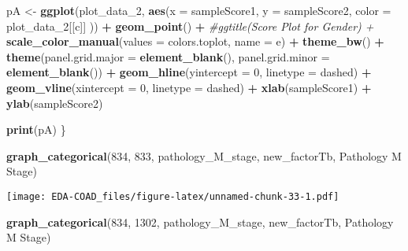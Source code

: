 \documentclass[
]{article}
\newenvironment{Shaded}{\begin{snugshade}}{\end{snugshade}}
\newcommand{\AttributeTok}[1]{\textcolor[rgb]{0.13,0.29,0.53}{#1}}
\newcommand{\CommentTok}[1]{\textcolor[rgb]{0.56,0.35,0.01}{\textit{#1}}}
\newcommand{\DecValTok}[1]{\textcolor[rgb]{0.00,0.00,0.81}{#1}}
\newcommand{\FunctionTok}[1]{\textcolor[rgb]{0.13,0.29,0.53}{\textbf{#1}}}
\newcommand{\NormalTok}[1]{#1}
\newcommand{\OtherTok}[1]{\textcolor[rgb]{0.56,0.35,0.01}{#1}}
\newcommand{\SpecialCharTok}[1]{\textcolor[rgb]{0.81,0.36,0.00}{\textbf{#1}}}
\newcommand{\StringTok}[1]{\textcolor[rgb]{0.31,0.60,0.02}{#1}}
\begin{document}
\begin{Shaded}
\begin{Highlighting}[]
\NormalTok{  pA }\OtherTok{\textless{}{-}} \FunctionTok{ggplot}\NormalTok{(plot\_data\_2,}
             \FunctionTok{aes}\NormalTok{(}\AttributeTok{x =}\NormalTok{ sampleScore1, }\AttributeTok{y =}\NormalTok{ sampleScore2, }\AttributeTok{color =}\NormalTok{ plot\_data\_2[[c]]}
\NormalTok{                 )) }\SpecialCharTok{+}
        \FunctionTok{geom\_point}\NormalTok{() }\SpecialCharTok{+}
        \CommentTok{\#ggtitle(\textquotesingle{}Score Plot for Gender\textquotesingle{}) +}
        \FunctionTok{scale\_color\_manual}\NormalTok{(}\AttributeTok{values =}\NormalTok{ colors.toplot, }\AttributeTok{name =}\NormalTok{ e) }\SpecialCharTok{+}
        \FunctionTok{theme\_bw}\NormalTok{() }\SpecialCharTok{+}
        \FunctionTok{theme}\NormalTok{(}\AttributeTok{panel.grid.major =} \FunctionTok{element\_blank}\NormalTok{(),}
        \AttributeTok{panel.grid.minor =} \FunctionTok{element\_blank}\NormalTok{()) }\SpecialCharTok{+}
        \FunctionTok{geom\_hline}\NormalTok{(}\AttributeTok{yintercept =} \DecValTok{0}\NormalTok{, }\AttributeTok{linetype =} \StringTok{\textquotesingle{}dashed\textquotesingle{}}\NormalTok{) }\SpecialCharTok{+}
        \FunctionTok{geom\_vline}\NormalTok{(}\AttributeTok{xintercept =} \DecValTok{0}\NormalTok{, }\AttributeTok{linetype =} \StringTok{\textquotesingle{}dashed\textquotesingle{}}\NormalTok{) }\SpecialCharTok{+}
        \FunctionTok{xlab}\NormalTok{(sampleScore1) }\SpecialCharTok{+} \FunctionTok{ylab}\NormalTok{(sampleScore2)}

\FunctionTok{print}\NormalTok{(pA)}
\NormalTok{\}}
\end{Highlighting}
\end{Shaded}

\begin{Shaded}
\begin{Highlighting}[]
\FunctionTok{graph\_categorical}\NormalTok{(}\DecValTok{834}\NormalTok{, }\DecValTok{833}\NormalTok{, }\StringTok{\textquotesingle{}pathology\_M\_stage\textquotesingle{}}\NormalTok{, new\_factorTb, }\StringTok{\textquotesingle{}Pathology M Stage\textquotesingle{}}\NormalTok{)}
\end{Highlighting}
\end{Shaded}

\texttt{[image: EDA-COAD\_files/figure-latex/unnamed-chunk-33-1.pdf]}

\begin{Shaded}
\begin{Highlighting}[]
\FunctionTok{graph\_categorical}\NormalTok{(}\DecValTok{834}\NormalTok{, }\DecValTok{1302}\NormalTok{, }\StringTok{\textquotesingle{}pathology\_M\_stage\textquotesingle{}}\NormalTok{, new\_factorTb, }\StringTok{\textquotesingle{}Pathology M Stage\textquotesingle{}}\NormalTok{)}
\end{Highlighting}
\end{Shaded}
\end{document}
